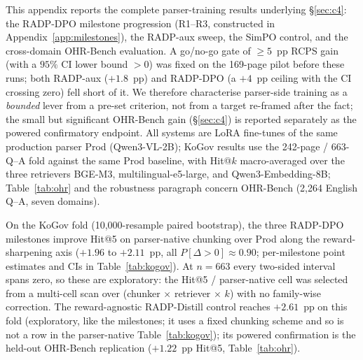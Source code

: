 \documentclass[11pt]{article}
\newcommand{\rcps}{\textsc{RCPS}}
\begin{document}
This appendix reports the complete parser-training results underlying \S\ref{sec:c4}: the RADP-DPO milestone progression (R1--R3, constructed in Appendix~\ref{app:milestones}), the RADP-aux sweep, the SimPO control, and the cross-domain OHR-Bench evaluation. A go/no-go gate of $\ge 5$~pp \rcps{} gain (with a $95\%$ CI lower bound $> 0$) was fixed on the 169-page pilot before these runs; both RADP-aux ($+1.8$~pp) and RADP-DPO (a $+4$~pp ceiling with the CI crossing zero) fell short of it. We therefore characterise parser-side training as a \emph{bounded} lever from a pre-set criterion, not from a target re-framed after the fact; the small but significant OHR-Bench gain (\S\ref{sec:c4}) is reported separately as the powered confirmatory endpoint. All systems are LoRA fine-tunes of the same production parser Prod (Qwen3-VL-2B); KoGov results use the 242-page / 663-Q--A fold against the same Prod baseline, with Hit@$k$ macro-averaged over the three retrievers BGE-M3, multilingual-e5-large, and Qwen3-Embedding-8B; Table~\ref{tab:ohr} and the robustness paragraph concern OHR-Bench (2{,}264 English Q--A, seven domains).

On the KoGov fold (10{,}000-resample paired bootstrap), the three RADP-DPO milestones improve Hit@5 on parser-native chunking over Prod along the reward-sharpening axis ($+1.96$ to $+2.11$~pp, all $P[\Delta{>}0] \approx 0.90$; per-milestone point estimates and CIs in Table~\ref{tab:kogov}). At $n = 663$ every two-sided interval spans zero, so these are exploratory: the Hit@5 / parser-native cell was selected from a multi-cell scan over (chunker $\times$ retriever $\times$ $k$) with no family-wise correction. The reward-agnostic RADP-Distill control reaches $+2.61$~pp on this fold (exploratory, like the milestones; it uses a fixed chunking scheme and so is not a row in the parser-native Table~\ref{tab:kogov}); its powered confirmation is the held-out OHR-Bench replication ($+1.22$~pp Hit@5, Table~\ref{tab:ohr}).
\end{document}
